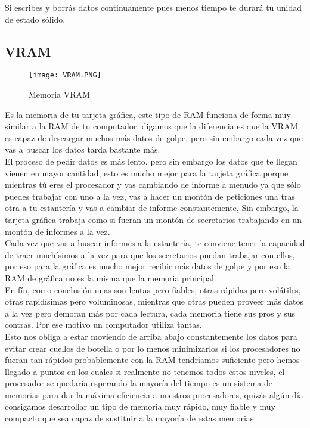 \documentclass{article}
\begin{document}
Si escribes y borrás datos continuamente pues menos tiempo te durará tu unidad de estado sólido.\\

\subsection{VRAM}

\begin{figure}[h]
\texttt{[image: VRAM.PNG]}
\centering
\caption{Memoria VRAM}
\label{fig:Memoria VRAM}
\end{figure}

Es la memoria de tu tarjeta gráfica, este tipo de RAM funciona de forma muy similar a la RAM de tu computador, digamos que la diferencia es que la VRAM es capaz de descargar muchos más datos de golpe, pero sin embargo cada vez que vas a buscar los datos tarda bastante más.\\

El proceso de pedir datos es más lento, pero sin embargo los datos que te llegan vienen en mayor cantidad, esto es mucho mejor para la tarjeta gráfica porque mientras tú eres el procesador y vas cambiando de informe a menudo ya que sólo puedes trabajar con uno a la vez, vas a hacer un montón de peticiones una tras otra a tu estantería y vas a cambiar de informe constantemente, Sin embargo, la tarjeta gráfica trabaja como si fueran un montón de secretarios trabajando en un montón de informes a la vez.\\ 

Cada vez que vas a buscar informes a la estantería, te conviene tener la capacidad de traer muchísimos a la vez para que los secretarios puedan trabajar con ellos, por eso para la gráfica es mucho mejor recibir más datos de golpe y por eso la RAM de gráfica no es la misma que la memoria principal.\\ 

En fín, como conclusión unas son lentas pero fiables, otras rápidas pero volátiles, otras rapidísimas pero voluminosas, mientras que otras pueden proveer más datos a la vez pero demoran más por cada lectura, cada memoria tiene sus pros y sus contras. Por ese motivo un computador utiliza tantas.\\

Esto nos obliga a estar moviendo de arriba abajo constantemente los datos para evitar crear cuellos de botella o por lo menos minimizarlos si los procesadores no fueran tan rápidos probablemente con la RAM tendríamos suficiente pero hemos llegado a puntos en los cuales si realmente no tenemos todos estos niveles, el procesador se quedaría esperando la mayoría del tiempo es un sistema de memorias para dar la máxima eficiencia a nuestros procesadores, quizás algún día consigamos desarrollar un tipo de memoria muy rápido, muy fiable y muy compacto que sea capaz  de sustituir a la mayoría de estas memorias.\\
\end{document}
